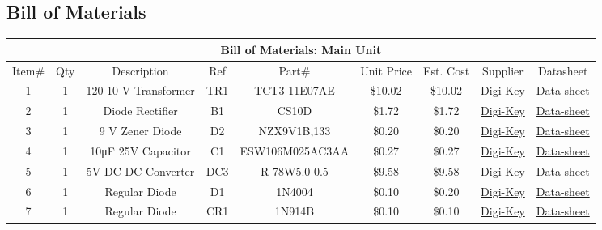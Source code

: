\begin{landscape}
\section{Bill of Materials}
\begin{center}
  \begin{table}[h]
    \addtocounter{table}{-1}
  \begin{longtable}[c]{|c|c|c|c|c|c|c|c|c|}
    \hline
    \multicolumn{9}{|c|}{Bill of Materials: Main Unit}\\
    \hline
    Item\#&Qty&Description&Ref&Part\#&Unit Price&Est. Cost&Supplier&Datasheet\\
    \hline
    1&1&120-10 \si{\V} Transformer&TR1&TCT3-11E07AE&\$10.02&\$10.02&\href{https://www.digikey.com/en/products/detail/triad-magnetics/TCT3-11E07AE/3995758}{Digi-Key}&\href{http://catalog.triadmagnetics.com/Asset/TCT3-11E07AE.pdf}{Data-sheet}\\
    \hline
    2&1&Diode Rectifier&B1&CS10D&\$1.72&\$1.72&\href{https://www.digikey.com/en/products/detail/diotec-semiconductor/CS10D/13153883}{Digi-Key}&\href{https://diotec.com/tl_files/diotec/files/pdf/datasheets/cs10d.pdf}{Data-sheet}\\
    \hline
    3&1&9 \si{\V} Zener Diode&D2&NZX9V1B,133&\$0.20&\$0.20&\href{https://www.digikey.com/en/products/detail/nexperia-usa-inc/NZX9V1B-133/2119779}{Digi-Key}&\href{https://assets.nexperia.com/documents/data-sheet/NZX_SER.pdf}{Data-sheet}\\
    \hline
    4&1&10\si{\micro\farad} 25\si{\V} Capacitor&C1&ESW106M025AC3AA&\$0.27&\$0.27&\href{https://www.digikey.com/en/products/detail/kemet/ESW106M025AC3AA/13176208?s=N4IgTCBcDaIBwHYCCBhOBGArJkBdAvkA}{Digi-Key}&\href{https://api.kemet.com/component-edge/download/datasheet/ESW106M025AC3AA.pdf}{Data-sheet}\\
    \hline
    5&1&5V DC-DC Converter&DC3&R-78W5.0-0.5&\$9.58&\$9.58&\href{https://www.digikey.com/en/products/detail/recom-power/R-78W5-0-0-5/4930586?s=N4IgTCBcDaIEoFoDsAOA6gVgHQAYE6wxAF0BfIA}{Digi-Key}&\href{https://recom-power.com/pdf/Innoline/R-78W-0.5.pdf}{Data-sheet}\\
    \hline
    6&1&Regular Diode&D1&1N4004&\$0.10&\$0.20&\href{https://www.digikey.com/en/products/detail/nte-electronics-inc/1N4004/11645015}{Digi-Key}&\href{https://www.digikey.com/en/products/detail/nte-electronics-inc/1N4004/11645015}{Data-sheet}\\
    \hline
    7&1&Regular Diode&CR1&1N914B&\$0.10&\$0.10&\href{https://www.digikey.com/en/products/detail/onsemi/1N914B/978757}{Digi-Key}&\href{https://www.onsemi.com/download/data-sheet/pdf/1n914-d.pdf}{Data-sheet}\\

\end{longtable}
\end{table}
\end{center}
\end{landscape}
